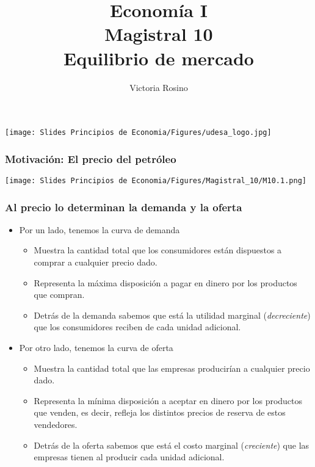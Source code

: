 \documentclass{beamer}
\title[Economía I]{Economía I \vspace{3mm}
\\ Magistral 10 \vspace{3mm} \\ Equilibrio de mercado}
\date{}
\author[Victoria Rosino]{Victoria Rosino}
\institute[]{Universidad de San Andrés}
\begin{document}
\begin{frame}
\vspace{0.3cm}
\titlepage
\centering
\vspace{-0.9cm}
\texttt{[image: Slides Principios de Economia/Figures/udesa\_logo.jpg]} 
\end{frame}


\begin{frame}
\frametitle{Motivación: El precio del petróleo}
\centering
\texttt{[image: Slides Principios de Economia/Figures/Magistral\_10/M10.1.png]}
\end{frame} 

\begin{frame}
\frametitle{Al precio lo determinan la demanda y la oferta}
\begin{itemize}
    \item Por un lado, tenemos la curva de demanda
    \begin{itemize}
        \item Muestra la cantidad total que los consumidores están dispuestos a comprar a cualquier precio dado.
        \item Representa la máxima disposición a pagar en dinero por los productos que compran.
        \item Detrás de la demanda sabemos que está la utilidad marginal (\textit{decreciente}) que los consumidores reciben de cada unidad adicional.
    \end{itemize}
    \vspace{2mm}
    \item Por otro lado, tenemos la curva de oferta
    \begin{itemize}
        \item Muestra la cantidad total que las empresas producirían a cualquier precio dado.
        \item Representa la mínima disposición a aceptar en dinero por los productos que venden, es decir, refleja los distintos precios de reserva de estos vendedores.
        \item Detrás de la oferta sabemos que está el costo marginal (\textit{creciente}) que las empresas tienen al producir cada unidad adicional.
        \end{itemize}
\end{itemize}
\end{frame}
\end{document}
